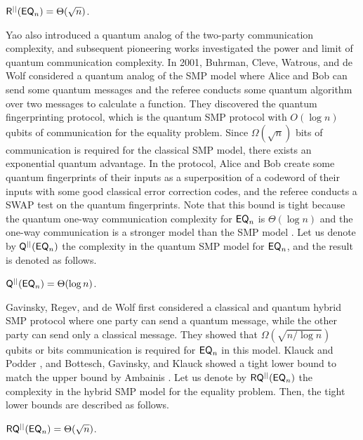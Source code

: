 \begin{theorem}
    $\mathsf{R}^{||}(\mathsf{EQ}_n) = \Theta (\sqrt{n})$.
\end{theorem}

Yao \cite{Yao93} also introduced a quantum analog of the two-party communication complexity, and subsequent pioneering works \cite{Kre95,CB97,BvDHT99,CvDNT98,BCW98,Raz99,BdW01} investigated the power and limit of quantum communication complexity. In 2001, Buhrman, Cleve, Watrous, and de Wolf \cite{BCWdW01} considered a quantum analog of the SMP model where Alice and Bob can send some quantum messages and the referee conducts some quantum algorithm over two messages to calculate a function. They discovered the quantum fingerprinting protocol, which is the quantum SMP protocol with $O(\log n)$ qubits of communication for the equality problem. Since $\Omega(\sqrt{n})$ bits of communication is required for the classical SMP model, there exists an exponential quantum advantage. In the \cite{BCWdW01} protocol, Alice and Bob create some quantum fingerprints of their inputs as a superposition of a codeword of their inputs with some good classical error correction codes, and the referee conducts a SWAP test \cite{BBD+97,BCWdW01} on the quantum fingerprints. Note that this bound is tight because the quantum one-way communication complexity for $\mathsf{EQ}_n$ is $\Theta(\log n)$ and the one-way communication is a stronger model than the SMP model \cite{BdW01,BCWdW01}. Let us denote by $\mathsf{Q}^{||}(\mathsf{EQ}_n)$ the complexity in the quantum SMP model for $\mathsf{EQ}_n$, and the result is denoted as follows.

\begin{theorem}
    $\mathsf{Q}^{||}(\mathsf{EQ}_n) = \Theta(\log n)$.
\end{theorem}

Gavinsky, Regev, and de Wolf \cite{GRdW08} first considered a classical and quantum hybrid SMP protocol where one party can send a quantum message, while the other party can send only a classical message. They showed that $\Omega(\sqrt{n/\log n})$ qubits or bits communication is required for $\mathsf{EQ}_n$ in this model. Klauck and Podder \cite{KP14}, and Bottesch, Gavinsky, and Klauck \cite{BGK15} showed a tight lower bound to match the upper bound by Ambainis \cite{Amb96}. Let us denote by $\mathsf{R} \mathsf{Q}^{||}(\mathsf{EQ}_n)$ the complexity in the hybrid SMP model for the equality problem. Then, the tight lower bounds are described as follows.

\begin{theorem}\label{thm:lower_bound_hybrid}
    $\mathsf{R} \mathsf{Q}^{||}(\mathsf{EQ}_n) = \Theta(\sqrt{n})$.
\end{theorem}


